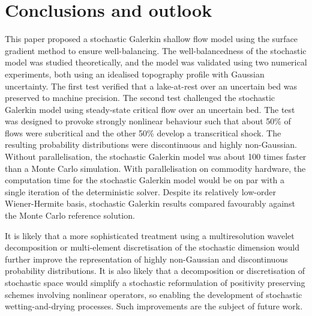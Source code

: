 \section{Conclusions and outlook}

This paper proposed a stochastic Galerkin shallow flow model using the surface gradient method to ensure well-balancing.
The well-balancedness of the stochastic model was studied theoretically, and the model was validated using two numerical experiments, both using an idealised topography profile with Gaussian uncertainty.
The first test verified that a lake-at-rest over an uncertain bed was preserved to machine precision.
The second test challenged the stochastic Galerkin model using steady-state critical flow over an uncertain bed.
The test was designed to provoke strongly nonlinear behaviour such that about 50\% of flows were subcritical and the other 50\% develop a transcritical shock.
The resulting probability distributions were discontinuous and highly non-Gaussian.
Without parallelisation, the stochastic Galerkin model was about 100 times faster than a Monte Carlo simulation.
With parallelisation on commodity hardware, the computation time for the stochastic Galerkin model would be on par with a single iteration of the deterministic solver.
Despite its relatively low-order Wiener-Hermite basis, stochastic Galerkin results compared favourably against the Monte Carlo reference solution.

It is likely that a more sophisticated treatment using a multiresolution wavelet decomposition \citep{lemaitre2004a,pettersson2014} or multi-element discretisation of the stochastic dimension \citep{wan-karniadakis2006,li-stinis2015} would further improve the representation of highly non-Gaussian and discontinuous probability distributions.
It is also likely that a decomposition or discretisation of stochastic space would simplify a stochastic reformulation of positivity preserving schemes involving nonlinear operators, so enabling the development of stochastic wetting-and-drying processes.
Such improvements are the subject of future work.